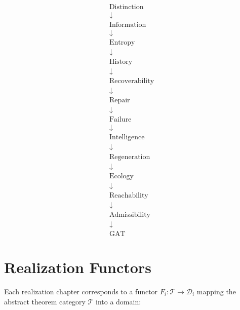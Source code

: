 \documentclass[12pt,twoside,openright]{book}
\begin{document}
\[
\begin{array}{c}
\text{Distinction} \\
\downarrow \\
\text{Information} \\
\downarrow \\
\text{Entropy} \\
\downarrow \\
\text{History} \\
\downarrow \\
\text{Recoverability} \\
\downarrow \\
\text{Repair} \\
\downarrow \\
\text{Failure} \\
\downarrow \\
\text{Intelligence} \\
\downarrow \\
\text{Regeneration} \\
\downarrow \\
\text{Ecology} \\
\downarrow \\
\text{Reachability} \\
\downarrow \\
\text{Admissibility} \\
\downarrow \\
\text{GAT}
\end{array}
\]

\section{Realization Functors}

Each realization chapter corresponds to a functor
$F_i : \mathcal{T} \to \mathcal{D}_i$ mapping the
abstract theorem category $\mathcal{T}$ into a domain:
\end{document}
